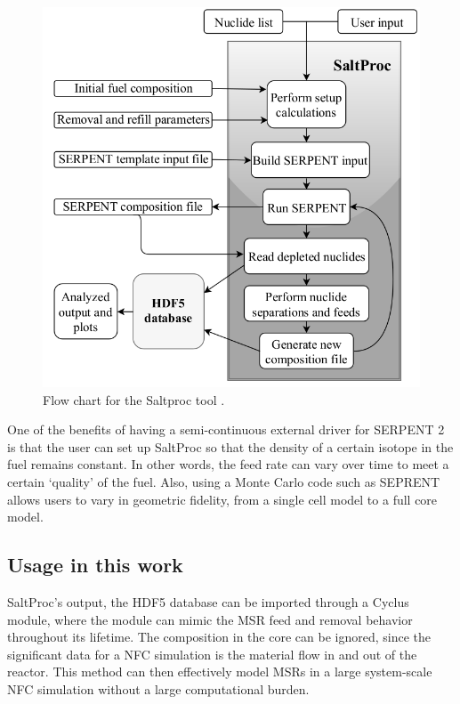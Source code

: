 \begin{figure}[htbp!]
	\begin{center}
		\includegraphics[scale=0.2]{./images/saltproc.png}
	\end{center}
	\caption{Flow chart for the Saltproc tool
		\cite{rykhlevskii_online_2017}.}
	\label{fig:saltproc}
\end{figure}


One of the benefits of having a semi-continuous external driver for
SERPENT 2 is that the user can set up SaltProc so that the density
of a certain isotope in the fuel remains constant. In other words,
the feed rate can vary over time to meet a certain `quality' of the fuel.
Also, using a Monte Carlo code such as SEPRENT allows users to vary
in geometric fidelity, from a single cell model to a full core model.

\subsection{Usage in this work}
SaltProc's output, the HDF5 database can be imported through a Cyclus
module, where the module can mimic the \gls{MSR} feed and removal
behavior throughout its lifetime. The composition in the core can
be ignored, since the significant data for a \gls{NFC} simulation
is the material flow in and out of the reactor. This method can
then effectively model \glspl{MSR} in a large system-scale \gls{NFC}
simulation without a large computational burden.